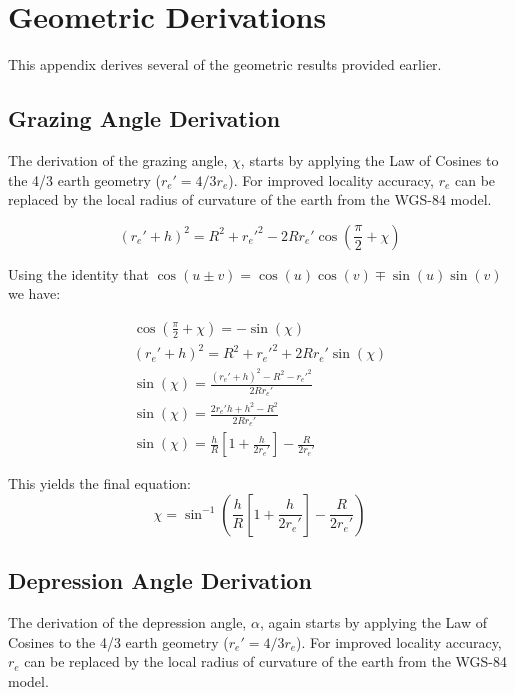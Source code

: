 \section{Geometric Derivations}
This appendix derives several of the geometric results provided earlier.

\subsection{Grazing Angle Derivation}
The derivation of the grazing angle, $\chi$, starts by applying the Law of Cosines to the 4/3 earth geometry ($r_e' = 4/3r_e$). For improved locality accuracy, $r_e$ can be replaced by the local radius of curvature of the earth from the WGS-84 model.

\begin{equation}
(r_e' + h)^2 = R^2 + r_e'^2 - 2Rr_e'\cos\left(\frac{\pi}{2} + \chi \right)
\label{gd_eq:1}
\end{equation}
\renewcommand{\baselinestretch}{2} \small\normalsize

\noindent Using the identity that $\cos(u \pm v) = \cos(u)\cos(v) \mp \sin(u)\sin(v)$ we have:

\begin{equation}
\begin{gathered}
\cos\left(\frac{\pi}{2} + \chi \right) = -\sin\left(\chi\right) \\
(r_e' + h)^2 = R^2 + r_e'^2 + 2Rr_e'\sin\left(\chi\right) \\
\sin\left(\chi\right) = \frac{\left(r_e' + h \right)^2 - R^2 - r_e'^2}{2Rr_e'} \\
\sin\left(\chi\right) = \frac{2r_e'h + h^2 - R^2}{2Rr_e'} \\
\sin\left(\chi\right) = \frac{h}{R}\left[1 + \frac{h}{2r_e'} \right] - \frac{R}{2r_e'} 
\end{gathered}
\label{gd_eq:2}
\end{equation}
\renewcommand{\baselinestretch}{2} \small\normalsize

\noindent This yields the final equation:
\begin{equation}
\label{gd_eq:3}
\boxed{  \chi = \sin^{-1}\left(\frac{h}{R}\left[1 + \frac{h}{2r_e'} \right] - \frac{R}{2r_e'} \right)}
\end{equation}
\renewcommand{\baselinestretch}{2} \small\normalsize

\subsection{Depression Angle Derivation}
The derivation of the depression angle, $\alpha$, again starts by applying the Law of Cosines to the 4/3 earth geometry ($r_e' = 4/3r_e$). For improved locality accuracy, $r_e$ can be replaced by the local radius of curvature of the earth from the WGS-84 model.

